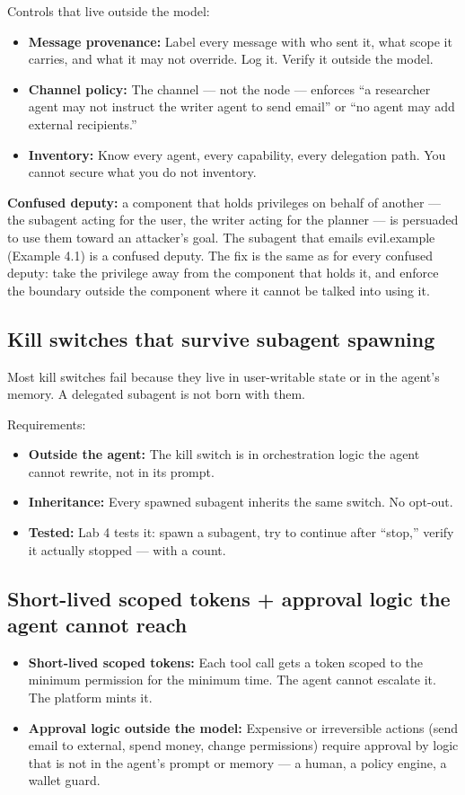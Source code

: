 Controls that live outside the model:
\begin{itemize}
\item \textbf{Message provenance:} Label every message with who sent it, what scope it carries, and what it may not override. Log it. Verify it outside the model.
\item \textbf{Channel policy:} The channel — not the node — enforces ``a researcher agent may not instruct the writer agent to send email'' or ``no agent may add external recipients.''
\item \textbf{Inventory:} Know every agent, every capability, every delegation path. You cannot secure what you do not inventory.
\end{itemize}

\begin{defbox}
\textbf{Confused deputy:} a component that holds privileges on behalf of another — the subagent acting for the user, the writer acting for the planner — is persuaded to use them toward an attacker's goal. The subagent that emails evil.example (Example 4.1) is a confused deputy. The fix is the same as for every confused deputy: take the privilege away from the component that holds it, and enforce the boundary outside the component where it cannot be talked into using it.
\end{defbox}

\subsection{Kill switches that survive subagent spawning}
Most kill switches fail because they live in user-writable state or in the agent's memory. A delegated subagent is not born with them.

Requirements:
\begin{itemize}
\item \textbf{Outside the agent:} The kill switch is in orchestration logic the agent cannot rewrite, not in its prompt.
\item \textbf{Inheritance:} Every spawned subagent inherits the same switch. No opt-out.
\item \textbf{Tested:} Lab 4 tests it: spawn a subagent, try to continue after ``stop,'' verify it actually stopped — with a count.
\end{itemize}

\subsection{Short-lived scoped tokens + approval logic the agent cannot reach}
\begin{itemize}
\item \textbf{Short-lived scoped tokens:} Each tool call gets a token scoped to the minimum permission for the minimum time. The agent cannot escalate it. The platform mints it.
\item \textbf{Approval logic outside the model:} Expensive or irreversible actions (send email to external, spend money, change permissions) require approval by logic that is not in the agent's prompt or memory — a human, a policy engine, a wallet guard.
\end{itemize}

